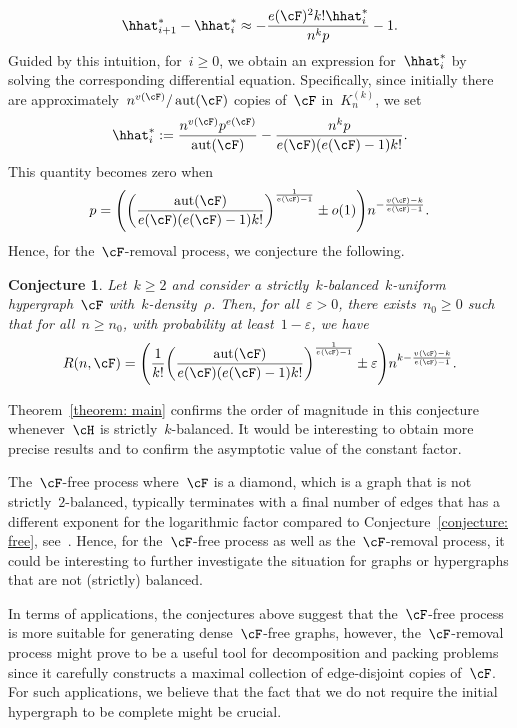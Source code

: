 \documentclass[11pt]{amsart}
\newcommand{\eps}{\varepsilon}
\DeclarePairedDelimiter{\paren}{\lparen}{\rparen}
\DeclareMathOperator{\aut}{aut}
\newtheorem{conjecture}[algocf]{Conjecture}
\theoremstyle{definition}
\numberwithin{equation}{section}
\begin{document}
	\begin{equation*}
		\hhat^*_{i+1}-\hhat^*_{i}\approx -\frac{e(\cF)^2k! \hhat^*_i}{n^k p}-1.
	\end{equation*}
	Guided by this intuition, for~$i\geq 0$, we obtain an expression for~$\hhat^*_i$ by solving the corresponding differential equation.
	Specifically, since initially there are approximately~$n^{v(\cF)}/\aut(\cF)$ copies of~$\cF$ in~$K_n^{(k)}$, we set
	\begin{equation*}
		\hhat^*_i:=\frac{n^{v(\cF)}p^{e(\cF)}}{\aut(\cF)}-\frac{n^k p}{e(\cF)(e(\cF)-1)k!}.
	\end{equation*}
	This quantity becomes zero when
	\begin{equation*}
		p=\paren[\Bigg]{\paren[\bigg]{ \frac{\aut(\cF)}{e(\cF)(e(\cF)-1)k!} }^{\frac{1}{e(\cF)-1}}\pm o(1)}n^{-\frac{v(\cF)-k}{e(\cF)-1}}.
	\end{equation*}
	Hence, for the~$\cF$-removal process, we conjecture the following.
	\begin{conjecture}\label{conjecture: removal}
		Let~$k\geq 2$ and consider a strictly~$k$-balanced~$k$-uniform hypergraph~$\cF$ with~$k$-density~$\rho$.
		Then, for all~$\eps>0$, there exists~$n_0\geq 0$ such that for all~$n\geq n_0$, with probability at least~$1-\eps$, we have
		\begin{equation*}
			R(n,\cF)=\paren[\Bigg]{\frac{1}{k!}\paren[\bigg]{ \frac{\aut(\cF)}{e(\cF)(e(\cF)-1)k!} }^{\frac{1}{e(\cF)-1}}\pm \eps}n^{k-\frac{v(\cF)-k}{e(\cF)-1}}.
		\end{equation*}
	\end{conjecture}
	
	Theorem~\ref{theorem: main} confirms the order of magnitude in this conjecture whenever~$\cH$ is strictly~$k$-balanced.
	It would be interesting to obtain more precise results and to confirm the asymptotic value of the constant factor.
	
	The~$\cF$-free process where~$\cF$ is a diamond, which is a graph that is not strictly~$2$-balanced, typically terminates with a final number of edges that has a different exponent for the logarithmic factor compared to Conjecture~\ref{conjecture: free}, see~\cite{P:14a}.
	Hence, for the~$\cF$-free process as well as the~$\cF$-removal process, it could be interesting to further investigate the situation for graphs or hypergraphs that are not (strictly) balanced.
	
	In terms of applications, the conjectures above suggest that the~$\cF$-free process is more suitable for generating dense~$\cF$-free graphs, however, the~$\cF$-removal process might prove to be a useful tool for decomposition and packing problems since it carefully constructs a maximal collection of edge-disjoint copies of~$\cF$.
	For such applications, we believe that the fact that we do not require the initial hypergraph to be complete might be crucial.
	
\end{document}
